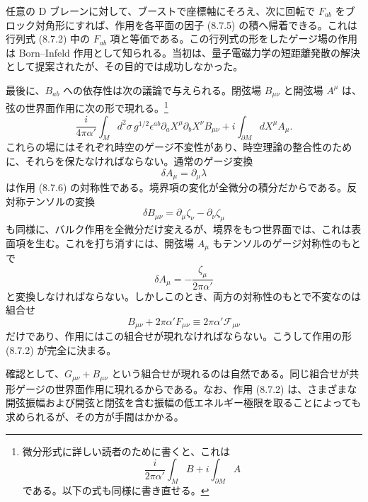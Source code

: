 任意の D ブレーンに対して、ブーストで座標軸にそろえ、次に回転で $F_{ab}$ をブロック対角形にすれば、作用を各平面の因子 (8.7.5) の積へ帰着できる。これは行列式 (8.7.2) 中の $F_{ab}$ 項と等価である。この行列式の形をしたゲージ場の作用は Born--Infeld 作用として知られる。当初は、量子電磁力学の短距離発散の解決として提案されたが、その目的では成功しなかった。

最後に、$B_{ab}$ への依存性は次の議論で与えられる。閉弦場 $B_{\mu\nu}$ と開弦場 $A^\mu$ は、弦の世界面作用に次の形で現れる。\footnote[3]{微分形式に詳しい読者のために書くと、これは
\[
\frac{i}{2\pi\alpha'}\int_M B+i\int_{\partial M}A
\]
である。以下の式も同様に書き直せる。}
\begin{equation}
\frac{i}{4\pi\alpha'}\int_M d^2\sigma\,g^{1/2}
\epsilon^{ab}\partial_aX^\mu\partial_bX^\nu B_{\mu\nu}
+i\int_{\partial M}dX^\mu A_\mu.
\tag{8.7.6}\label{eq:8.7.6}
\end{equation}
これらの場にはそれぞれ時空のゲージ不変性があり、時空理論の整合性のために、それらを保たなければならない。通常のゲージ変換
\begin{equation}
\delta A_\mu=\partial_\mu\lambda
\tag{8.7.7}\label{eq:8.7.7}
\end{equation}
は作用 (8.7.6) の対称性である。境界項の変化が全微分の積分だからである。反対称テンソルの変換
\begin{equation}
\delta B_{\mu\nu}=\partial_\mu\zeta_\nu-\partial_\nu\zeta_\mu
\tag{8.7.8}\label{eq:8.7.8}
\end{equation}
も同様に、バルク作用を全微分だけ変えるが、境界をもつ世界面では、これは表面項を生む。これを打ち消すには、開弦場 $A_\mu$ もテンソルのゲージ対称性のもとで
\begin{equation}
\delta A_\mu=-\frac{\zeta_\mu}{2\pi\alpha'}
\tag{8.7.9}\label{eq:8.7.9}
\end{equation}
と変換しなければならない。しかしこのとき、両方の対称性のもとで不変なのは組合せ
\begin{equation}
B_{\mu\nu}+2\pi\alpha'F_{\mu\nu}
\equiv2\pi\alpha'\mathcal F_{\mu\nu}
\tag{8.7.10}\label{eq:8.7.10}
\end{equation}
だけであり、作用にはこの組合せが現れなければならない。こうして作用の形 (8.7.2) が完全に決まる。

確認として、$G_{\mu\nu}+B_{\mu\nu}$ という組合せが現れるのは自然である。同じ組合せが共形ゲージの世界面作用に現れるからである。なお、作用 (8.7.2) は、さまざまな開弦振幅および開弦と閉弦を含む振幅の低エネルギー極限を取ることによっても求められるが、その方が手間はかかる。

